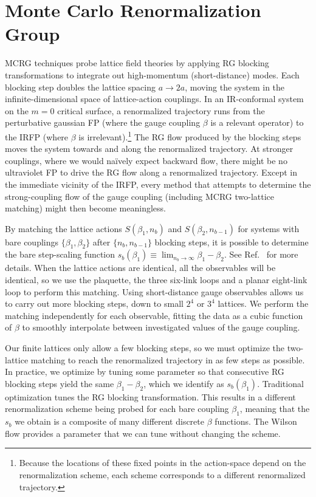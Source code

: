 \documentclass{PoS}
\newcommand{\be}{\ensuremath{\beta} }
\newcommand{\refcite}[1]{Ref.~\cite{#1}}
\begin{document}
\section{\label{sec:mcrg}Monte Carlo Renormalization Group} %
MCRG techniques probe lattice field theories by applying RG blocking transformations to integrate out high-momentum (short-distance) modes.
Each blocking step doubles the lattice spacing $a \to 2a$, moving the system in the infinite-dimensional space of lattice-action couplings.
In an IR-conformal system on the $m = 0$ critical surface, a renormalized trajectory runs from the perturbative gaussian FP (where the gauge coupling \be is a relevant operator) to the IRFP (where \be is irrelevant).\footnote{Because the locations of these fixed points in the action-space depend on the renormalization scheme, each scheme corresponds to a different renormalized trajectory.}
The RG flow produced by the blocking steps moves the system towards and along the renormalized trajectory.
At stronger couplings, where we would na\"ively expect backward flow, there might be no ultraviolet FP to drive the RG flow along a renormalized trajectory.
Except in the immediate vicinity of the IRFP, every method that attempts to determine the strong-coupling flow of the gauge coupling (including MCRG two-lattice matching) might then become meaningless.

By matching the lattice actions $S(\be_1, n_b)$ and $S(\be_2, n_{b - 1})$ for systems with bare couplings $\{\be_1, \be_2\}$ after $\{n_b, n_{b - 1}\}$ blocking steps, it is possible to determine the bare step-scaling function $s_b(\be_1) \equiv \lim_{n_b \to \infty} \be_1 - \be_2$.
See \refcite{Petropoulos:2012mg} for more details.
When the lattice actions are identical, all the observables will be identical, so we use the plaquette, the three six-link loops and a planar eight-link loop to perform this matching.
Using short-distance gauge observables allows us to carry out more blocking steps, down to small $2^4$ or $3^4$ lattices.
We perform the matching independently for each observable, fitting the data as a cubic function of \be to smoothly interpolate between investigated values of the gauge coupling.

Our finite lattices only allow a few blocking steps, so we must optimize the two-lattice matching to reach the renormalized trajectory in as few steps as possible.
In practice, we optimize by tuning some parameter so that consecutive RG blocking steps yield the same $\be_1 - \be_2$, which we identify as $s_b(\be_1)$.
Traditional optimization tunes the RG blocking transformation.
This results in a different renormalization scheme being probed for each bare coupling $\be_1$, meaning that the $s_b$ we obtain is a composite of many different discrete \be functions.
The Wilson flow provides a parameter that we can tune without changing the scheme.
\end{document}
